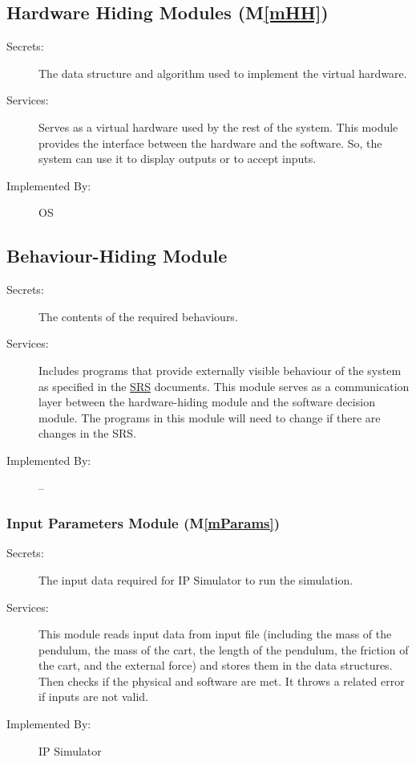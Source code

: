 \documentclass[12pt, titlepage]{article}
\newcommand{\mref}[1]{M\ref{#1}}
\begin{document}
\subsection{Hardware Hiding Modules (\mref{mHH})}

\begin{description}
\item[Secrets:]The data structure and algorithm used to implement the virtual hardware.
\item[Services:]Serves as a virtual hardware used by the rest of the
  system. This module provides the interface between the hardware and the
  software. So, the system can use it to display outputs or to accept inputs.
\item[Implemented By:] OS
\end{description}

\subsection{Behaviour-Hiding Module}

\begin{description}
\item[Secrets:] The contents of the required behaviours.
\item[Services:] Includes programs that provide externally visible behaviour of
  the system as specified in the \href{https://github.com/MinMah23/CAS741-Project/tree/main/docs/SRS}{SRS}
  documents. This module serves as a communication layer between the
  hardware-hiding module and the software decision module. The programs in this
  module will need to change if there are changes in the SRS.
\item[Implemented By:] --
\end{description}

\subsubsection{Input Parameters Module (\mref{mParams})}

\begin{description}
\item[Secrets:] The input data required for IP Simulator to run the simulation.

\item[Services:]This module reads input data from input file (including the mass of the pendulum, the mass of the cart, the length of the pendulum, the friction of the cart, and the external force) and stores them in the data structures. Then checks if the physical and software are met. It throws a related error if inputs are not valid.
\item[Implemented By:] IP Simulator
\end{description}
\end{document}
